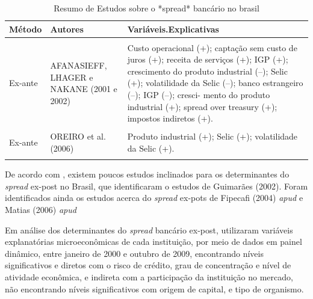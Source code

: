 \documentclass[12pt,openright,oneside,a4paper,chapter=TITLE,section=TITLE,subsection=Title,english,french,spanish,portugues,sumario=tradicional]{04-class-files/abntex2}
\begin{document}
\begin{table}
\caption{Resumo de Estudos sobre o *spread* bancário no brasil}
\begingroup\fontsize{10}{12}\selectfont

\begin{tabu} to 
\toprule
Método & Autores & Variáveis.Explicativas\\
\midrule
{} &  & \\
Ex-ante & AFANASIEFF, LHAGER e NAKANE (2001 e 2002) & Custo operacional (+); captação sem custo de juros (+); receita de serviços (+); IGP (+); crescimento do produto industrial (–); Selic (+); volatilidade da Selic (–); banco estrangeiro (–); IGP (–); cresci- mento do produto industrial (+); spread over treasury (+); impostos indiretos (+).\\
 &  & \\
Ex-ante & OREIRO et al. (2006) & Produto industrial (+); Selic (+); volatilidade da Selic (+).\\
 &  & \\
\bottomrule
\end{tabu}
\endgroup{}
\label{tab:estudos}
\end{table}

De acordo com \textcite{durigan:2018, dantas:2012}, existem poucos estudos inclinados para os determinantes do \emph{spread} ex-post no Brasil, que identificaram o estudos de Guimarães (2002). Foram identificados ainda os estudos acerca do \emph{spread} ex-pots de Fipecafi (2004) \emph{apud} \textcite{dantas:2012} e Matias (2006) \emph{apud} \textcite{leal:2006}

Em análise dos determinantes do \emph{spread} bancário ex-post, \textcite{dantas:2012} utilizaram variáveis explanatórias microeconômicas de cada instituição, por meio de dados em painel dinâmico, entre janeiro de 2000 e outubro de 2009, encontrando níveis significativos e diretos com o risco de crédito, grau de concentração e nível de atividade econômica, e indireta com a participação da instituição no mercado, não encontrando níveis significativos com origem de capital, e tipo de organismo.
\end{document}

